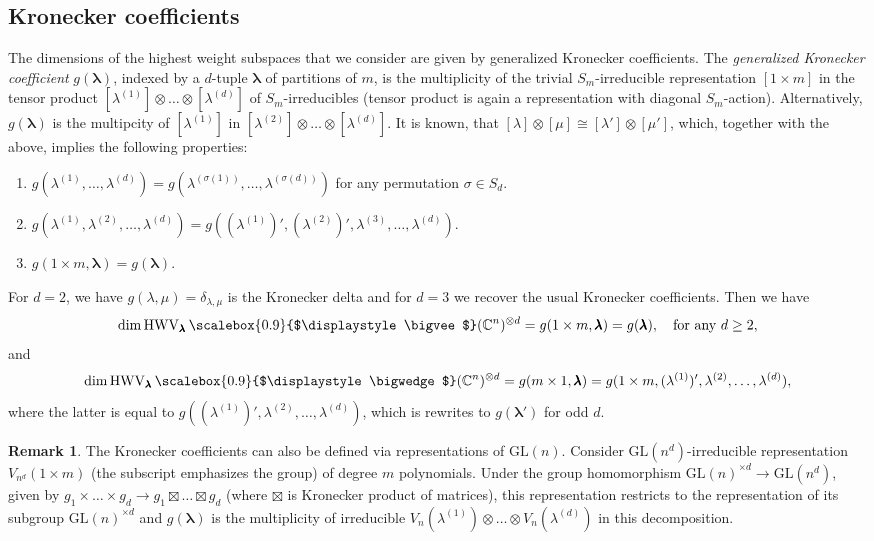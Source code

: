 \documentclass[12pt, reqno]{amsart}
\newtheorem{proposition}[theorem]{Proposition}
\theoremstyle{definition}
\newtheorem{remark}{Remark}[section]
\let\oldbigwedge\bigwedge
\let\oldbigvee\bigvee
\renewcommand{\bigwedge}{
  \mathop{
    \vcenter{
      \hbox{\scalebox{0.9}{$\displaystyle\oldbigwedge$}}
    }
  }
}
\renewcommand{\bigvee}{
  \mathop{
    \vcenter{
      \hbox{\scalebox{0.9}{$\displaystyle\oldbigvee$}}
    }
  }
}
\begin{document}
\subsection{Kronecker coefficients}
The dimensions of the highest weight subspaces that we consider are given by generalized Kronecker coefficients. The \textit{generalized Kronecker coefficient} $g(\pmb{\lambda})$, indexed by a $d$-tuple $\pmb{\lambda}$  of partitions of $m$, is the multiplicity of the trivial $S_m$-irreducible representation $[1 \times m]$ in the tensor product $[\lambda^{(1)}]\otimes \ldots \otimes [\lambda^{(d)}]$ of $S_m$-irreducibles (tensor product is again a representation with diagonal $S_m$-action). Alternatively, $g(\pmb{\lambda})$ is the multipcity of $[\lambda^{(1)}]$ in $[\lambda^{(2)}]\otimes \ldots \otimes [\lambda^{(d)}]$.
It is known, that $[\lambda]\otimes[\mu] \cong [\lambda']\otimes[\mu']$, which, together with the above, implies the following properties:
    \begin{enumerate}
        \item[(a)] $g(\lambda^{(1)},\ldots,\lambda^{(d)}) = g(\lambda^{(\sigma(1))},\ldots,\lambda^{(\sigma(d))})$ for any permutation $\sigma \in S_d$.
        \item[(b)] $g(\lambda^{(1)},\lambda^{(2)},\ldots,\lambda^{(d)}) = g((\lambda^{(1)})',(\lambda^{(2)})', \lambda^{(3)}, \ldots,\lambda^{(d)})$.
        \item[(c)] $g(1\times m, \pmb{\lambda}) = g(\pmb{\lambda})$.
    \end{enumerate} 
For $d = 2$, we have $g(\lambda, \mu) = \delta_{\lambda, \mu}$ is the Kronecker delta and for $d = 3$ we recover the usual Kronecker coefficients. 
Then we have
$$
    \dim \mathrm{HWV}_{\pmb{\lambda}} \bigvee (\mathbb{C}^n)^{\otimes d} = g(1 \times m, \pmb{\lambda}) = g(\pmb{\lambda}), \quad \text{for any }d \ge 2,
$$
and
$$
\dim \mathrm{HWV}_{\pmb{\lambda}} \bigwedge (\mathbb{C}^n)^{\otimes d} = g(m \times 1, \pmb{\lambda}) = g(1 \times m, (\lambda^{(1)})', \lambda^{(2)},\ldots,\lambda^{(d)}),
$$
where the latter is equal to $g((\lambda^{(1)})', \lambda^{(2)},\ldots,\lambda^{(d)})$, which is rewrites to $g(\pmb{\lambda}')$ for odd $d$.
\begin{remark}
    The Kronecker coefficients can also be defined via representations of $\mathrm{GL}(n)$.
    Consider $\mathrm{GL}(n^d)$-irreducible representation $V_{n^d}(1 \times m)$ (the subscript emphasizes the group) of degree $m$ polynomials. Under the group homomorphism $\mathrm{GL}(n)^{\times d} \to \mathrm{GL}(n^d)$, given by $g_1\times\ldots\times g_d \to g_1 \boxtimes \ldots \boxtimes g_d$ (where $\boxtimes$ is Kronecker product of matrices), this representation restricts to the representation of its subgroup $\mathrm{GL}(n)^{\times d}$ and $g(\pmb{\lambda})$ is the multiplicity of irreducible $V_n(\lambda^{(1)})\otimes\ldots\otimes V_n(\lambda^{(d)})$ in this decomposition.
\end{remark}
\end{document}
